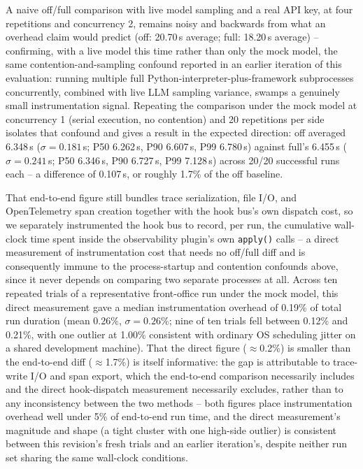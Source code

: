 \documentclass[conference]{IEEEtran}
\begin{document}
A naive off/full comparison with live model sampling and a real API key, at four repetitions and concurrency 2, remains noisy and backwards from what an overhead claim would predict (off: 20.70\,s average; full: 18.20\,s average) -- confirming, with a live model this time rather than only the mock model, the same contention-and-sampling confound reported in an earlier iteration of this evaluation: running multiple full Python-interpreter-plus-framework subprocesses concurrently, combined with live LLM sampling variance, swamps a genuinely small instrumentation signal. Repeating the comparison under the mock model at concurrency 1 (serial execution, no contention) and 20 repetitions per side isolates that confound and gives a result in the expected direction: off averaged 6.348\,s ($\sigma=0.181$\,s; P50 6.262\,s, P90 6.607\,s, P99 6.780\,s) against full's 6.455\,s ($\sigma=0.241$\,s; P50 6.346\,s, P90 6.727\,s, P99 7.128\,s) across 20/20 successful runs each -- a difference of 0.107\,s, or roughly 1.7\% of the off baseline.

That end-to-end figure still bundles trace serialization, file I/O, and OpenTelemetry span creation together with the hook bus's own dispatch cost, so we separately instrumented the hook bus to record, per run, the cumulative wall-clock time spent inside the observability plugin's own \texttt{apply()} calls -- a direct measurement of instrumentation cost that needs no off/full diff and is consequently immune to the process-startup and contention confounds above, since it never depends on comparing two separate processes at all. Across ten repeated trials of a representative front-office run under the mock model, this direct measurement gave a median instrumentation overhead of 0.19\% of total run duration (mean 0.26\%, $\sigma=0.26\%$; nine of ten trials fell between 0.12\% and 0.21\%, with one outlier at 1.00\% consistent with ordinary OS scheduling jitter on a shared development machine). That the direct figure ($\approx$0.2\%) is smaller than the end-to-end diff ($\approx$1.7\%) is itself informative: the gap is attributable to trace-write I/O and span export, which the end-to-end comparison necessarily includes and the direct hook-dispatch measurement necessarily excludes, rather than to any inconsistency between the two methods -- both figures place instrumentation overhead well under 5\% of end-to-end run time, and the direct measurement's magnitude and shape (a tight cluster with one high-side outlier) is consistent between this revision's fresh trials and an earlier iteration's, despite neither run set sharing the same wall-clock conditions.
\end{document}
